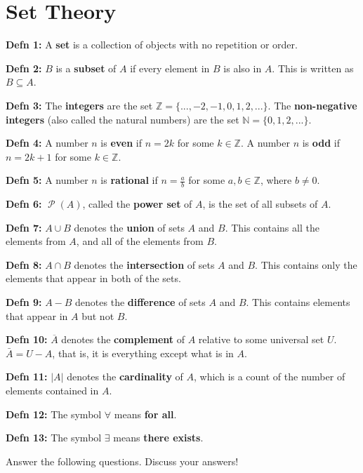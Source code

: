 \documentclass[12pt,letterpaper]{article}
\newcommand\N{\mathbb N}
\newcommand\Z{\mathbb Z}
\newcommand\Pow{\ensuremath{\operatorname{\mathcal{P}}}}
\begin{document}
\newpage
      \section*{Set Theory}

      \textbf{Defn 1:} A \textbf{set} is a collection of objects with no repetition or order.

      \textbf{Defn 2:} $B$ is a \textbf{subset} of $A$ if every element in $B$ is also in $A$. This is written as $B \subseteq A$.

      \textbf{Defn 3:} The \textbf{integers} are the set $\Z = \{..., -2, -1, 0, 1, 2, ...\}$. The \textbf{non-negative integers} (also called the natural numbers) are the set $\N = \{0,1,2,...\}$.

      \textbf{Defn 4:} A number $n$ is \textbf{even} if $n = 2k$ for some $k \in \Z$. A number $n$ is \textbf{odd} if $n = 2k + 1$ for some $k \in \Z$.

      \textbf{Defn 5:} A number $n$ is \textbf{rational} if $n = \frac{a}{b}$ for some $a,b \in \Z$, where $b \neq 0$. 

	\textbf{Defn 6:} $\Pow{(A)}$, called the \textbf{power set} of $A$, is the set of all subsets of $A$.
	
	\textbf{Defn 7:} $A \cup B$ denotes the \textbf{union} of sets $A$ and $B$. This contains all the elements from $A$, and all of the elements from $B$. 
	
	\textbf{Defn 8:} $A \cap B$ denotes the \textbf{intersection} of sets $A$ and $B$. This contains only the elements that appear in both of the sets.
	
	\textbf{Defn 9:} $A - B$ denotes the \textbf{difference} of sets $A$ and $B$. This contains elements that appear in $A$ but not $B$.
	
	\textbf{Defn 10:} $\overline{A}$ denotes the \textbf{complement} of $A$ relative to some universal set $U$. $\bar{A} = U - A$, that is, it is everything except what is in $A$.
	
	\textbf{Defn 11:} $|A|$ denotes the \textbf{cardinality} of $A$, which is a count of the number of elements contained in $A$.
	
	\textbf{Defn 12:} The symbol $\forall$ means \textbf{for all}.
	
	\textbf{Defn 13:} The symbol $\exists$ means \textbf{there exists}.
	
	Answer the following questions. Discuss your answers!
\end{document}
